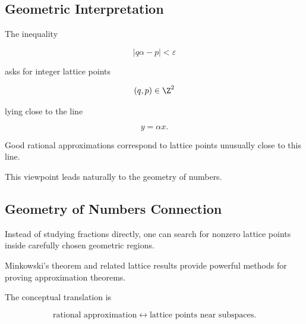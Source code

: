 \subsection{Geometric Interpretation}
\label{subsec:diophantine-geometric-interpretation}

The inequality

\[ |q\alpha-p|<\varepsilon \]

asks for integer lattice points

\[ (q,p)\in\Z^2 \]

lying close to the line

\[ y=\alpha x. \]

\begin{centereddiagram}
\end{centereddiagram}

Good rational approximations correspond to lattice points unusually close to
this line.

This viewpoint leads naturally to the geometry of numbers.

\subsection{Geometry of Numbers Connection}
\label{subsec:geometry-of-numbers-connection}

Instead of studying fractions directly, one can search for nonzero lattice
points inside carefully chosen geometric regions.

Minkowski's theorem and related lattice results provide powerful methods for
proving approximation theorems.

The conceptual translation is

\[
\boxed{
\text{rational approximation}
\longleftrightarrow
\text{lattice points near subspaces}.
}
\]

